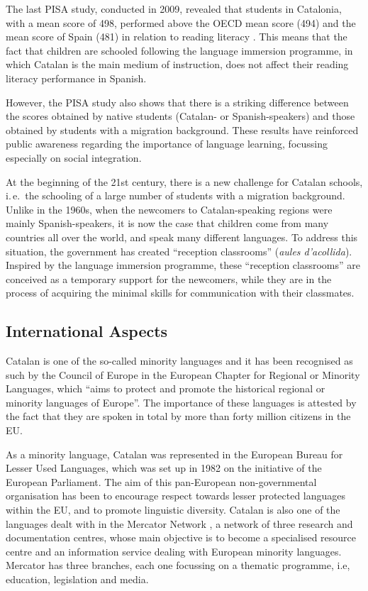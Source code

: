 \begin{multicols}{2}
The last PISA study, conducted in 2009, revealed that students in Catalonia, with a mean score of 498, performed above the OECD mean score (494) and the mean score of Spain (481) in relation to reading literacy \cite{CAT-Nota7}. This means that the fact that children are schooled following the language immersion programme, in which Catalan is the main medium of instruction, does not affect their reading literacy performance in Spanish.

However, the PISA study also shows that there is a striking difference between the scores obtained by native students (Catalan- or Spanish-speakers) and those obtained by students with a migration background. These results have reinforced public awareness regarding the importance of language learning, focussing especially on social integration.

At the beginning of the 21st century, there is a new challenge for Catalan schools, i.\,e.~the schooling of a large number of students with a migration background. Unlike in the 1960s, when the newcomers to Catalan-speaking regions were mainly Spanish-speakers, it is now the case that children come from many countries all over the world, and speak many different languages. To address this situation, the government has created “reception classrooms” (\textit{aules d’acollida}). Inspired by the language immersion programme, these “reception classrooms” are conceived as a temporary support for the newcomers, while they are in the process of acquiring the minimal skills for communication with their classmates.

\subsection{International Aspects}

Catalan is one of the so-called minority languages and it has been recognised as such by the Council of Europe in the European Chapter for Regional or Minority Languages, which “aims to protect and promote the historical regional or minority languages of Europe”. The importance of these languages is attested by the fact that they are spoken in total by more than forty million citizens in the EU.

As a minority language, Catalan was represented in the European Bureau for Lesser Used Languages, which was set up in 1982 on the initiative of the European Parliament. The aim of this pan-European non-governmental organisation has been to encourage respect towards lesser protected languages within the EU, and to promote linguistic diversity. Catalan is also one of the languages dealt with in the Mercator Network \cite{CAT-Nota8}, a network of three research and documentation centres, whose main objective is to become a specialised resource centre and an information service dealing with European minority languages. Mercator has three branches, each one focus\-sing on a thematic programme, i.e, education, legislation and media.


\end{multicols}
